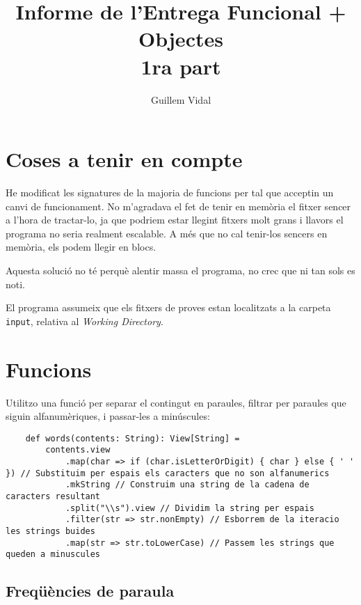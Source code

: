 \documentclass{article}
\begin{document}
\title{Informe de l'Entrega Funcional + Objectes \\ 1ra part}
\author{Guillem Vidal}
\date{}
\maketitle

\section{Coses a tenir en compte}

He modificat les signatures de la majoria de funcions per tal que acceptin un
canvi de funcionament. No m'agradava el fet de tenir en memòria el fitxer
sencer a l'hora de tractar-lo, ja que podriem estar llegint fitxers molt grans
i llavors el programa no seria realment escalable. A més que no cal tenir-los
sencers en memòria, els podem llegir en blocs.

Aquesta solució no té perquè alentir massa el programa, no crec que ni tan sols
es noti.

El programa assumeix que els fitxers de proves estan localitzats a la carpeta
\texttt{input}, relativa al \emph{Working Directory}.

\section{Funcions}

Utilitzo una funció per separar el contingut en paraules, filtrar per paraules
que siguin alfanumèriques, i passar-les a minúscules:

\begin{lstlisting}
    def words(contents: String): View[String] =
        contents.view
            .map(char => if (char.isLetterOrDigit) { char } else { ' ' }) // Substituim per espais els caracters que no son alfanumerics
            .mkString // Construim una string de la cadena de caracters resultant
            .split("\\s").view // Dividim la string per espais
            .filter(str => str.nonEmpty) // Esborrem de la iteracio les strings buides
            .map(str => str.toLowerCase) // Passem les strings que queden a minuscules
\end{lstlisting}

\subsection{Freqüències de paraula}
\end{document}
